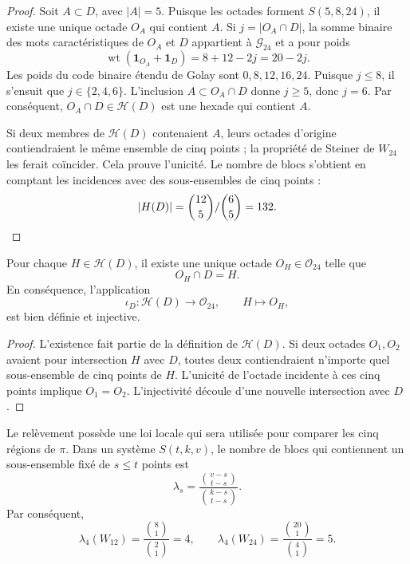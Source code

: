 \begin{proof}
Soit \(A\subset D\), avec \(|A|=5\). Puisque les octades forment
\(S(5,8,24)\), il existe une unique octade \(O_A\) qui contient \(A\). Si
\(j=|O_A\cap D|\), la somme binaire des mots caractéristiques de
\(O_A\) et \(D\) appartient à \(\mathcal G_{24}\) et a pour poids
\[
 \operatorname{wt}(\mathbf1_{O_A}+\mathbf1_D)=8+12-2j=20-2j.
\]
Les poids du code binaire étendu de Golay sont
\(0,8,12,16,24\). Puisque \(j\leq8\), il s'ensuit que
\(j\in\{2,4,6\}\). L'inclusion \(A\subset O_A\cap D\) donne \(j\geq5\),
donc \(j=6\). Par conséquent, \(O_A\cap D\in\mathcal H(D)\) est une hexade qui
contient \(A\).

Si deux membres de \(\mathcal H(D)\) contenaient \(A\), leurs octades
d'origine contiendraient le même ensemble de cinq points ; la propriété de
Steiner de \(W_{24}\) les ferait coïncider. Cela prouve l'unicité. Le
nombre de blocs s'obtient en comptant les incidences avec des sous-ensembles de cinq
points :
\[
 |\mathcal H(D)|
 =\frac{\binom{12}{5}}{\binom65}=132.\qedhere
\]
\end{proof}

\begin{theorem}
\label{p12-83-c17-s1:thm:elevacion-unica-hexada}
Pour chaque \(H\in\mathcal H(D)\), il existe une unique octade
\(O_H\in\mathcal O_{24}\) telle que
\[
 O_H\cap D=H.
\]
En conséquence, l'application
\[
 \iota_D:\mathcal H(D)\longrightarrow\mathcal O_{24},
 \qquad H\longmapsto O_H,
\]
est bien définie et injective.
\end{theorem}

\begin{proof}
L'existence fait partie de la définition de \(\mathcal H(D)\). Si deux
octades \(O_1,O_2\) avaient pour intersection \(H\) avec \(D\), toutes deux
contiendraient n'importe quel sous-ensemble de cinq points de \(H\). L'unicité de
l'octade incidente à ces cinq points implique \(O_1=O_2\).
L'injectivité découle d'une nouvelle intersection avec \(D\).
\end{proof}

Le relèvement possède une loi locale qui sera utilisée pour comparer les cinq
régions de \(\pi\). Dans un système \(S(t,k,v)\), le nombre de blocs qui
contiennent un sous-ensemble fixé de \(s\leq t\) points est
\[
 \lambda_s=\frac{\binom{v-s}{t-s}}{\binom{k-s}{t-s}}.
\]
Par conséquent,
\begin{equation}
 \lambda_4(W_{12})
 =\frac{\binom81}{\binom21}=4,
 \qquad
 \lambda_4(W_{24})
 =\frac{\binom{20}1}{\binom41}=5.
 \label{p12-83-c17-s1:eq:lambda4-w12-w24}
\end{equation}

